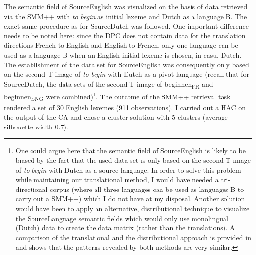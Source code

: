 The semantic field of SourceEnglish was visualized on the basis of data retrieved via the SMM++ with \textit{to} \textit{begin} as initial lexeme and Dutch as a language B. The exact same procedure as for SourceDutch was followed. One important difference needs to be noted here: since the DPC does not contain data for the translation directions French to English and English to French, only one language can be used as a language B when an English initial lexeme is chosen, in casu, Dutch. The establishment of the data set for SourceEnglish was consequently only based on the second T-image of \textit{to} \textit{begin} with Dutch as a pivot language (recall that for SourceDutch, the data sets of the second T-image of beginnen\textsubscript{FR} and beginnen\textsubscript{ENG} were combined)\footnote{One could argue here that the semantic field of SourceEnglish is likely to be biased by the fact that the used data set is only based on the second T-image of \textit{to} \textit{begin} with Dutch as a source language. In order to solve this problem while maintaining our translational method, I would have needed a tri-directional corpus (where all three languages can be used as languages B to carry out a SMM++) which I do not have at my disposal. Another solution would have been to apply an alternative, distributional technique to visualize the SourceLanguage semantic fields which would only use monolingual (Dutch) data to create the data matrix (rather than the translations). A comparison of the translational and the distributional approach is provided in \citet{vandevoorde_distributional_2016} and shows that the patterns revealed by both methods are very similar.}. The outcome of the SMM++ retrieval task rendered a set of 30 English lexemes (911 observations). I carried out a HAC on the output of the CA and chose a cluster solution with 5 clusters (average silhouette width 0.7).

